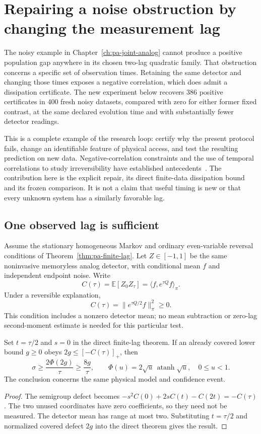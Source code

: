 \chapter{Repairing a noise obstruction by changing the measurement lag}
\label{ch:pa-retiming}

The noisy example in Chapter~\ref{ch:pa-joint-analog} cannot produce a
positive population gap anywhere in its chosen two-lag quadratic family.
That obstruction concerns a specific set of observation times. Retaining the
same detector and changing those times exposes a negative correlation, which
does admit a dissipation certificate. The new experiment below recovers
386 positive certificates in 400 fresh noisy datasets, compared with zero
for either former fixed contrast, at the same declared evolution time and
with substantially fewer detector readings.

This is a complete example of the research loop: certify why the present
protocol fails, change an identifiable feature of physical access, and test
the resulting prediction on new data. Negative-correlation constraints and
the use of temporal correlations to study irreversibility have established
antecedents~\cite{vlAldousFill2002,ciVSR2024,ciVSRProofs2024}. The contribution
here is the explicit repair, its direct finite-data dissipation bound and its
frozen comparison. It is not a claim that useful timing is new or that every
unknown system has a similarly favorable lag.

\section{One observed lag is sufficient}
Assume the stationary homogeneous Markov and ordinary even-variable reversal
conditions of Theorem~\ref{thm:pa-finite-lag}. Let $Z\in[-1,1]$ be the same
noninvasive memoryless analog detector, with conditional mean $f$ and
independent endpoint noise. Write
\[
 C(\tau)=\mathbb E[Z_0Z_\tau]=\langle f,e^{\tau Q}f\rangle_\pi.
\]
Under a reversible explanation,
\[
 C(\tau)=\|e^{\tau Q/2}f\|_\pi^2\geq0.
\]
This condition includes a nonzero detector mean; no mean subtraction or
zero-lag second-moment estimate is needed for this particular test.

\begin{corollary}
Set $t=\tau/2$ and $s=0$ in the direct finite-lag theorem. If an already
covered lower bound $g\geq0$ obeys $2g\leq[-C(\tau)]_+$, then
\begin{equation}
 \sigma\geq\frac{2\Phi(2g)}{\tau}\geq\frac{8g}{\tau},\qquad
 \Phi(u)=2\sqrt u\,\operatorname{atanh}\sqrt u,
 \quad 0\leq u<1.
 \label{eq:pa-retiming-bridge}
\end{equation}
The conclusion concerns the same physical model and confidence event.
\end{corollary}
\begin{proof}
The semigroup defect becomes
$-s^2C(0)+2sC(t)-C(2t)=-C(\tau)$.
The two unused coordinates have zero coefficients, so they need not be
measured. The detector mean has range at most two. Substituting $t=\tau/2$
and normalized covered defect $2g$ into the direct theorem gives the result.
\end{proof}

